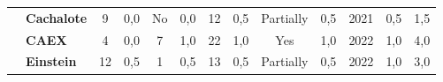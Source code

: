 \begin{table}[!htb]
\begin{tabular}{c|p{2cm}|cc|cc|cc|cc|cc|c}
    \hhline{>{\arrayrulecolor[rgb]{0.753,0.753,0.753}}-->{\arrayrulecolor{black}}-----------}
    \rowcolor[rgb]{0.898,0.898,0.898} {\cellcolor[rgb]{0.753,0.753,0.753}}          & {\cellcolor[rgb]{0.753,0.753,0.753}}\textbf{Cachalote}                                             & 9                                                                         & 0,0                                                                       & No                                                                        & 0,0                                                                      & 12                                                       & 0,5                                               & Partially                                          & 0,5                                               & 2021                                               & 0,5                                                                                                                                                 & 1,5 \\
    {\cellcolor[rgb]{0.753,0.753,0.753}}                                            & {\cellcolor[rgb]{0.753,0.753,0.753}}\textbf{CAEX}                                                  & 4                                                                         & 0,0                                                                       & 7                                                                         & 1,0                                                                      & 22                                                       & 1,0                                               & Yes                                                & 1,0                                               & 2022                                               & 1,0                                                                                                                                                 & 4,0 \\
    \rowcolor[rgb]{0.898,0.898,0.898} {\cellcolor[rgb]{0.753,0.753,0.753}}          & {\cellcolor[rgb]{0.753,0.753,0.753}}\textbf{Einstein}                                              & 12                                                                        & 0,5                                                                       & 1                                                                         & 0,5                                                                      & 13                                                       & 0,5                                               & Partially                                          & 0,5                                               & 2022                                               & 1,0                                                                                                                                                 & 3,0 \\

\end{tabular}
\end{table}
